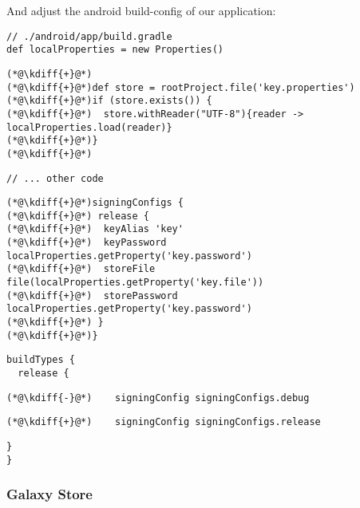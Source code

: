 \noindent And adjust the android build-config of our application:\\

{
\xpretocmd{\lstlisting}{\vspace{-12pt}}{}{}
\begin{lstlisting}
// ./android/app/build.gradle
def localProperties = new Properties()
\end{lstlisting}
\begin{lstlisting}[firstnumber=3, backgroundcolor=\color{backgreen}]
(*@\kdiff{+}@*)
(*@\kdiff{+}@*)def store = rootProject.file('key.properties')
(*@\kdiff{+}@*)if (store.exists()) {
(*@\kdiff{+}@*)  store.withReader("UTF-8"){reader -> localProperties.load(reader)}
(*@\kdiff{+}@*)}
(*@\kdiff{+}@*)
\end{lstlisting}
\begin{lstlisting}[firstnumber=9]
// ... other code
\end{lstlisting}
\begin{lstlisting}[firstnumber=63, backgroundcolor=\color{backgreen}]
(*@\kdiff{+}@*)signingConfigs {
(*@\kdiff{+}@*) release {
(*@\kdiff{+}@*)  keyAlias 'key'
(*@\kdiff{+}@*)  keyPassword localProperties.getProperty('key.password')
(*@\kdiff{+}@*)  storeFile file(localProperties.getProperty('key.file'))
(*@\kdiff{+}@*)  storePassword localProperties.getProperty('key.password')
(*@\kdiff{+}@*) }
(*@\kdiff{+}@*)}
\end{lstlisting}
\begin{lstlisting}[firstnumber=71]
buildTypes {
  release {
\end{lstlisting}
\begin{lstlisting}[firstnumber=73, backgroundcolor=\color{backred}]
(*@\kdiff{-}@*)    signingConfig signingConfigs.debug
\end{lstlisting}
\begin{lstlisting}[firstnumber=73, backgroundcolor=\color{backgreen}]
(*@\kdiff{+}@*)    signingConfig signingConfigs.release
\end{lstlisting}
\begin{lstlisting}[firstnumber=74]
  }
}
\end{lstlisting}
}


\subsubsection{Galaxy Store}

